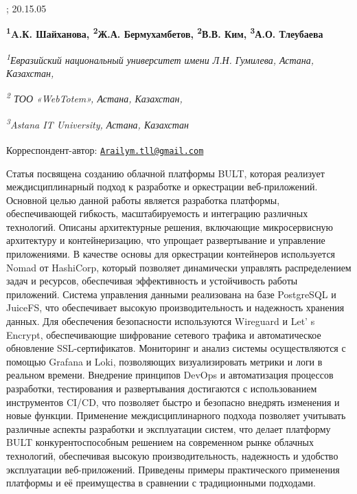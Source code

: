 ; 20.15.05{}

\begin{articleheader}

{\bfseries
\textsuperscript{1}A.К. Шайханова\authorid,
\textsuperscript{2}Ж.А. Бермухамбетов\authorid,
\textsuperscript{2}В.В. Ким\authorid,
\textsuperscript{3}А.О. Тлеубаева\textsuperscript{\envelope } \authorid}
\end{articleheader}

\begin{affiliation}
\emph{\textsuperscript{1}Евразийский национальный университет имени Л.Н. Гумилева, Астана, Казахстан,}

\emph{\textsuperscript{2} ТОО «WebTotem», Астана, Казахстан,}

\emph{\textsuperscript{3}Astana IT University, Астана, Казахстан}

\textsuperscript{\envelope }Корреспондент-автор: \href{mailto:Arailym.tll@gmail.com}{\nolinkurl{Arailym.tll@gmail.com}}
\end{affiliation}

Статья посвящена созданию облачной платформы BULT, которая реализует
междисциплинарный подход к разработке и оркестрации веб-приложений.
Основной целью данной работы является разработка платформы,
обеспечивающей гибкость, масштабируемость и интеграцию различных
технологий. Описаны архитектурные решения, включающие микросервисную
архитектуру и контейнеризацию, что упрощает развертывание и управление
приложениями. В качестве основы для оркестрации контейнеров используется
Nomad от HashiCorp, который позволяет динамически управлять
распределением задач и ресурсов, обеспечивая эффективность и
устойчивость работы приложений. Система управления данными реализована
на базе PostgreSQL и JuiceFS, что обеспечивает высокую
производительность и надежность хранения данных. Для обеспечения
безопасности используются Wireguard и Let' s Encrypt,
обеспечивающие шифрование сетевого трафика и автоматическое обновление
SSL-сертификатов. Мониторинг и анализ системы осуществляются с помощью
Grafana и Loki, позволяющих визуализировать метрики и логи в реальном
времени. Внедрение принципов DevOps и автоматизация процессов
разработки, тестирования и развертывания достигаются с использованием
инструментов CI/CD, что позволяет быстро и безопасно внедрять изменения
и новые функции. Применение междисциплинарного подхода позволяет
учитывать различные аспекты разработки и эксплуатации систем, что делает
платформу BULT конкурентоспособным решением на современном рынке
облачных технологий, обеспечивая высокую производительность, надежность
и удобство эксплуатации веб-приложений. Приведены примеры практического
применения платформы и её преимущества в сравнении с традиционными
подходами.

